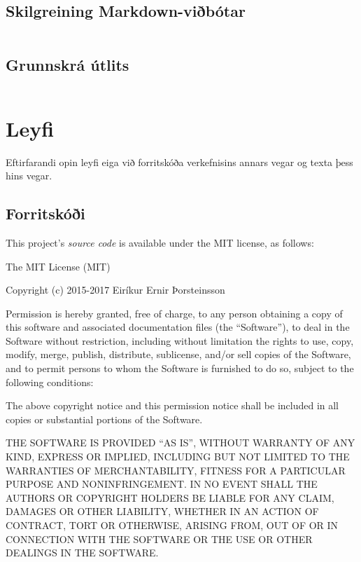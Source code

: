 \documentclass[a4paper,12pt,twoside,BCOR=10mm]{scrbook}
\begin{document}
\section{Skilgreining Markdown-viðbótar}
\label{code:footnote-extension}
\inputminted[fontsize=\scriptsize, frame=lines, linenos=true, python3=true, label=footnotes.py]{python}{../sql\string_web/markdown\string_extensions/footnotes.py}
\section{Grunnskrá útlits}
\label{code:base-template}
\inputminted[fontsize=\scriptsize, frame=lines, linenos=true, label=base.html]{django}{../templates/base.html}

\chapter{Leyfi}
\label{sec:license}
Eftirfarandi opin leyfi eiga við forritskóða verkefnisins annars vegar og texta þess hins vegar.
\section{Forritskóði}\label{code}

This project's \emph{source code} is available under the MIT license, as
follows:

The MIT License (MIT)

Copyright (c) 2015-2017 Eiríkur Ernir Þorsteinsson

Permission is hereby granted, free of charge, to any person obtaining a
copy of this software and associated documentation files (the
``Software''), to deal in the Software without restriction, including
without limitation the rights to use, copy, modify, merge, publish,
distribute, sublicense, and/or sell copies of the Software, and to
permit persons to whom the Software is furnished to do so, subject to
the following conditions:

The above copyright notice and this permission notice shall be included
in all copies or substantial portions of the Software.

THE SOFTWARE IS PROVIDED ``AS IS'', WITHOUT WARRANTY OF ANY KIND,
EXPRESS OR IMPLIED, INCLUDING BUT NOT LIMITED TO THE WARRANTIES OF
MERCHANTABILITY, FITNESS FOR A PARTICULAR PURPOSE AND NONINFRINGEMENT.
IN NO EVENT SHALL THE AUTHORS OR COPYRIGHT HOLDERS BE LIABLE FOR ANY
CLAIM, DAMAGES OR OTHER LIABILITY, WHETHER IN AN ACTION OF CONTRACT,
TORT OR OTHERWISE, ARISING FROM, OUT OF OR IN CONNECTION WITH THE
SOFTWARE OR THE USE OR OTHER DEALINGS IN THE SOFTWARE.
\end{document}
